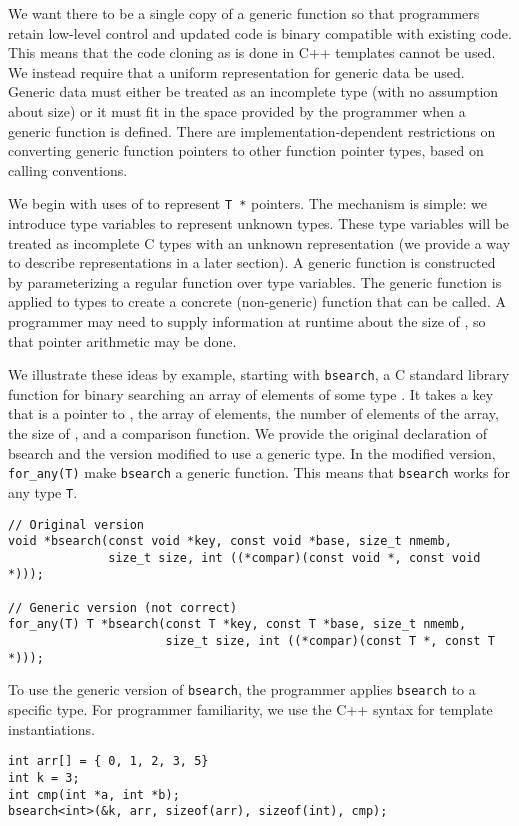 We want there to be a single copy of a generic function so that programmers
retain low-level control and updated code is binary compatible with existing code.
This means that the code cloning as is done in C++ templates cannot be used.  
We instead require that a uniform representation for generic data be used.
Generic data must either be treated as an incomplete type (with no assumption
about size) or it must fit in the space provided by the programmer when
a generic function is defined. There are implementation-dependent restrictions 
on converting generic function pointers to  other function pointer types,
based on calling conventions.

We begin with uses of \uncheckedptrvoid{} to represent \lstinline+T *+ pointers.
The mechanism is simple: we introduce type variables to represent unknown types.
These type variables will be treated as incomplete C types with an unknown
representation (we provide a way to describe representations in a later
section).   A generic function is constructed by parameterizing a
regular function over type variables.  The generic function is applied
to types to create a concrete (non-generic) function that can be called.
A programmer may need to supply information at runtime about the size of ,
so that pointer arithmetic may be done.

We illustrate these ideas by example, starting with \lstinline+bsearch+, 
a C standard library function for binary
searching an array of elements of some type .  It
takes a key that is a pointer to , the array of elements, the number of elements of
the array, the size of , and a comparison function.  We provide the original declaration
of bsearch and the version modified to use a generic type.  In the modified version,
\lstinline+for_any(T)+ make \lstinline+bsearch+ a generic function.  This means that
\lstinline+bsearch+ works for any type \lstinline+T+.
\begin{lstlisting}
// Original version
void *bsearch(const void *key, const void *base, size_t nmemb, 
              size_t size, int ((*compar)(const void *, const void *)));

// Generic version (not correct)
for_any(T) T *bsearch(const T *key, const T *base, size_t nmemb,
                      size_t size, int ((*compar)(const T *, const T *)));
\end{lstlisting}
To use the generic version of \lstinline+bsearch+, the programmer applies \lstinline+bsearch+ to
a specific type.  For programmer familiarity, we use the C++ syntax for template
instantiations.
\begin{lstlisting}
int arr[] = { 0, 1, 2, 3, 5}
int k = 3;
int cmp(int *a, int *b);
bsearch<int>(&k, arr, sizeof(arr), sizeof(int), cmp);
\end{lstlisting}

